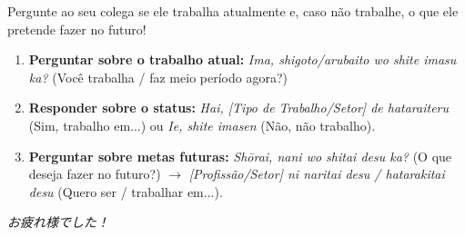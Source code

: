 \documentclass[12pt,a4paper]{article}
\begin{document}
\vspace{0.5cm}

\begin{tcolorbox}[colback=jppurple!6, colframe=jppurple, title=\textbf{Dinâmica em Grupo}, fonttitle=\bfseries]
\small
Pergunte ao seu colega se ele trabalha atualmente e, caso não trabalhe, o que ele pretende fazer no futuro!

\vspace{0.2cm}

\begin{enumerate}[leftmargin=*]
    \item \textbf{Perguntar sobre o trabalho atual:} \textit{Ima, shigoto/arubaito wo shite imasu ka?} (Você trabalha / faz meio período agora?)
    \item \textbf{Responder sobre o status:} \textit{Hai, [Tipo de Trabalho/Setor] de hataraiteru} (Sim, trabalho em...) ou \textit{Ie, shite imasen} (Não, não trabalho).
    \item \textbf{Perguntar sobre metas futuras:} \textit{Shōrai, nani wo shitai desu ka?} (O que deseja fazer no futuro?) $\rightarrow$ \textit{[Profissão/Setor] ni naritai desu / hatarakitai desu} (Quero ser / trabalhar em...).
\end{enumerate}
\end{tcolorbox}

\vspace{0.4cm}

\begin{center}
    \small\color{gray} \textit{お疲れ様でした！}
\end{center}
\end{document}
